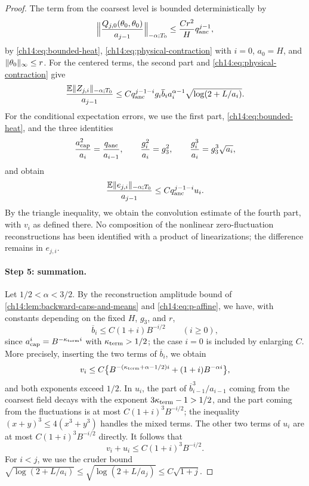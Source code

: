\begin{proof}
The term from the coarsest level is bounded deterministically by
\[
 \Bigl\lVert\frac{Q_{j,0}(\theta_0,\theta_0)}{a_{j-1}}\Bigr\rVert_{-\alpha;T_0}\le\frac{Cr^2}{H}q_{\mathrm{anc}}^{j-1},
\]
by \eqref{ch14:eq:bounded-heat}, \eqref{ch14:eq:physical-contraction} with $i=0$, $a_0=H$, and $\lVert \theta_0\rVert_\infty\le r$. For the centered terms, the second part and \eqref{ch14:eq:physical-contraction} give
\[
 \frac{\mathbb E\lVert Z_{j,i}\rVert_{-\alpha;T_0}}{a_{j-1}}\le Cq_{\mathrm{anc}}^{j-1-i}g_i\overline b_ia_i^{\alpha-1}\sqrt{\log(2+L/a_i)}.
\]
For the conditional expectation errors, we use the first part, \eqref{ch14:eq:bounded-heat}, and the three identities
\[
 \frac{a_{\mathrm{cap}}^2}{a_i}=\frac{q_{\mathrm{anc}}}{a_{i-1}},\qquad\frac{g_i^2}{a_i}=g_3^2,\qquad\frac{g_i^3}{a_i}=g_3^3\sqrt{a_i},
\]
and obtain
\[
 \frac{\mathbb E\lVert e_{j,i}\rVert_{-\alpha;T_0}}{a_{j-1}}\le Cq_{\mathrm{anc}}^{j-1-i}u_i.
\]
By the triangle inequality, we obtain the convolution estimate of the fourth part, with $v_i$ as defined there. No composition of the nonlinear zero-fluctuation reconstructions has been identified with a product of linearizations; the difference remains in $e_{j,i}$.

\paragraph{Step 5: summation.}
Let $1/2<\alpha<3/2$. By the reconstruction amplitude bound of \cref{ch14:lem:backward-caps-and-means} and \eqref{ch14:eq:p-affine}, we have, with constants depending on the fixed $H$, $g_3$, and $r$,
\begin{equation}\label{ch14:eq:cap-decay}
 \overline b_i\le C(1+i)B^{-i/2}\qquad(i\ge0),
\end{equation}
since $a_{\mathrm{cap}}^i=B^{-\kappa_{\mathrm{term}} i}$ with $\kappa_{\mathrm{term}}>1/2$; the case $i=0$ is included by enlarging $C$. More precisely, inserting the two terms of $\overline b_i$, we obtain
\[
 v_i\le C\bigl\{B^{-(\kappa_{\mathrm{term}}+\alpha-1/2)i}+(1+i)B^{-\alpha i}\bigr\},
\]
and both exponents exceed $1/2$. In $u_i$, the part of $\overline b_{i-1}^3/a_{i-1}$ coming from the coarsest field decays with the exponent $3\kappa_{\mathrm{term}}-1>1/2$, and the part coming from the fluctuations is at most $C(1+i)^3B^{-i/2}$; the inequality $(x+y)^3\le4(x^3+y^3)$ handles the mixed terms. The other two terms of $u_i$ are at most $C(1+i)^3B^{-i/2}$ directly. It follows that
\begin{equation}\label{ch14:eq:vu-decay}
 v_i+u_i\le C(1+i)^3B^{-i/2}.
\end{equation}
For $i<j$, we use the cruder bound $\sqrt{\log(2+L/a_i)}\le\sqrt{\log(2+L/a_j)}\le C\sqrt{1+j}$.


\end{proof}
